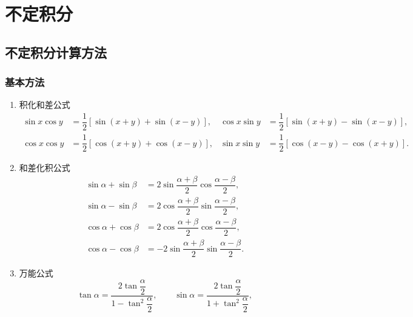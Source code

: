 \setcounter{chapter}{4}
\pagestyle{fancy}

\chapter{不定积分}


\section{不定积分计算方法}


\subsection{基本方法}

\begin{theorem}
    \leavevmode
    \begin{enumerate}[label=\arabic*.]
        \item 积化和差公式
              \begin{align*}
                  \sin x\cos y & =\dfrac{1}{2}[\sin(x+y)+\sin(x-y)],
                               & \cos x\sin y                        & =\dfrac{1}{2}[\sin(x+y)-\sin(x-y)], \\
                  \cos x\cos y & =\dfrac{1}{2}[\cos(x+y)+\cos(x-y)],
                               & \sin x\sin y                        & =\dfrac{1}{2}[\cos(x-y)-\cos(x+y)].
              \end{align*}
        \item 和差化积公式
              \begin{align*}
                  \sin\alpha+\sin\beta
                   & =2\sin\dfrac{\alpha+\beta}{2}\cos\dfrac{\alpha-\beta}{2},  \\
                  \sin\alpha-\sin\beta
                   & =2\cos\dfrac{\alpha+\beta}{2}\sin\dfrac{\alpha-\beta}{2},  \\
                  \cos\alpha+\cos\beta
                   & =2\cos\dfrac{\alpha+\beta}{2}\cos\dfrac{\alpha-\beta}{2},  \\
                  \cos\alpha-\cos\beta
                   & =-2\sin\dfrac{\alpha+\beta}{2}\sin\dfrac{\alpha-\beta}{2}.
              \end{align*}
        \item 万能公式
              \[
                  \tan\alpha=\dfrac{2\tan\dfrac{\alpha}{2}}{1-\tan^2\dfrac{\alpha}{2}},
                  \qquad
                  \sin\alpha=\dfrac{2\tan\dfrac{\alpha}{2}}{1+\tan^2\dfrac{\alpha}{2}},
\]
\end{enumerate}
\end{theorem}
